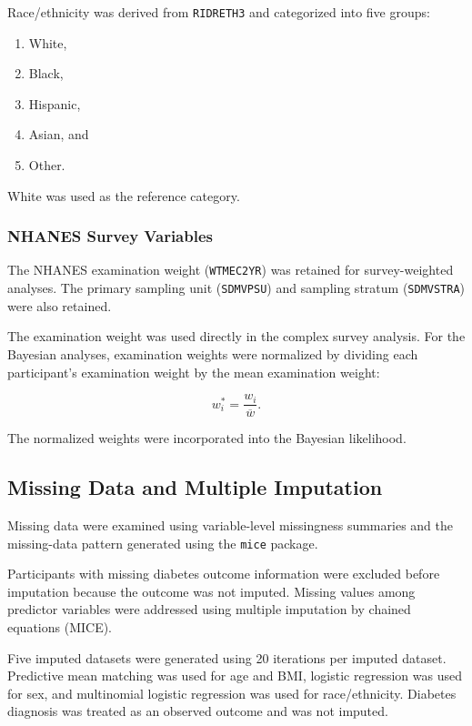 \documentclass[12pt]{article}
\begin{document}
Race/ethnicity was derived from \texttt{RIDRETH3} and categorized into five groups:

\begin{enumerate}
    \item White,
    \item Black,
    \item Hispanic,
    \item Asian, and
    \item Other.
\end{enumerate}

White was used as the reference category.

\subsubsection{NHANES Survey Variables}

The NHANES examination weight (\texttt{WTMEC2YR}) was retained for survey-weighted analyses. The primary sampling unit (\texttt{SDMVPSU}) and sampling stratum (\texttt{SDMVSTRA}) were also retained.

The examination weight was used directly in the complex survey analysis. For the Bayesian analyses, examination weights were normalized by dividing each participant's examination weight by the mean examination weight:

\[
w_i^{*}
=
\frac{w_i}
{\overline{w}}.
\]

The normalized weights were incorporated into the Bayesian likelihood.


\subsection{Missing Data and Multiple Imputation}

Missing data were examined using variable-level missingness summaries and the missing-data pattern generated using the \texttt{mice} package.

Participants with missing diabetes outcome information were excluded before imputation because the outcome was not imputed. Missing values among predictor variables were addressed using multiple imputation by chained equations (MICE).

Five imputed datasets were generated using 20 iterations per imputed dataset. Predictive mean matching was used for age and BMI, logistic regression was used for sex, and multinomial logistic regression was used for race/ethnicity. Diabetes diagnosis was treated as an observed outcome and was not imputed.
\end{document}

